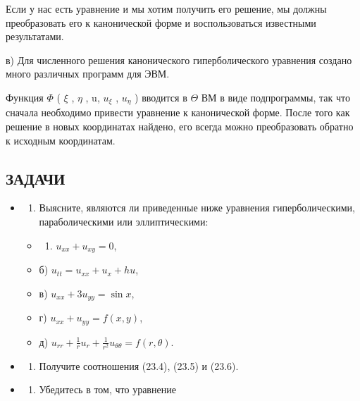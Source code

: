 \documentclass[
  ukrainian,
]{article}
\providecommand{\tightlist}{%
  \setlength{\itemsep}{0pt}\setlength{\parskip}{0pt}}
\begin{document}
Если у нас есть уравнение и мы хотим получить его решение, мы должны
преобразовать его к канонической форме и воспользоваться известными
результатами.

в) Для численного решения канонического гиперболического уравнения
создано много различных программ для ЭВМ.

Функция \(\Phi\) ( \(\xi\) , \(\eta\) , u, \(u_{\xi}\) , \(u_{\eta}\) )
вводится в \(\Theta\) ВМ в виде подпрограммы, так что сначала необходимо
привести уравнение к канонической форме. После того как решение в новых
координатах найдено, его всегда можно преобразовать обратно к исходным
координатам.

\subsection{ЗАДАЧИ}\label{ux437ux430ux434ux430ux447ux438}

\begin{itemize}
\item
  \begin{enumerate}
  \def\labelenumi{\arabic{enumi}.}
  \tightlist
  \item
    Выясните, являются ли приведенные ниже уравнения гиперболическими,
    параболическими или эллиптическими:
  \end{enumerate}

  \begin{itemize}
  \tightlist
  \item
    \begin{enumerate}
    \def\labelenumi{\alph{enumi})}
    \tightlist
    \item
      \(u_{xx}+u_{xy}=0\),
    \end{enumerate}
  \item
    б) \(u_{tt}=u_{xx}+u_x+hu\),
  \item
    в) \(u_{xx}+3u_{yy}=\sin x\),
  \item
    г) \(u_{xx}+u_{yy}=f(x,y)\),
  \item
    д)
    \(u_{rr}+\frac{1}{r}u_r+\frac{1}{r^2}u_{\theta\theta}=f(r,\theta)\).
  \end{itemize}
\item
  \begin{enumerate}
  \def\labelenumi{\arabic{enumi}.}
  \setcounter{enumi}{1}
  \tightlist
  \item
    Получите соотношения (23.4), (23.5) и (23.6).
  \end{enumerate}
\item
  \begin{enumerate}
  \def\labelenumi{\arabic{enumi}.}
  \setcounter{enumi}{2}
  \tightlist
  \item
    Убедитесь в том, что уравнение
  \end{enumerate}
\end{itemize}
\end{document}
